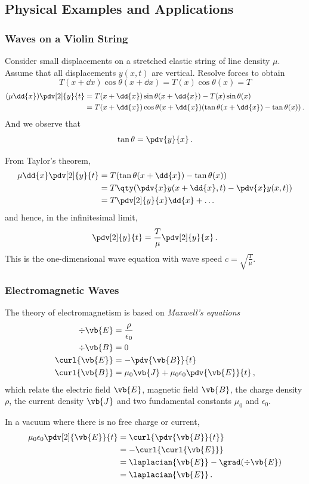 \documentclass{article}
\theoremstyle{plain}\theoremheaderfont{\normalfont\itshape}\theorembodyfont{\rmfamily}\theoremseparator{.}\newtheorem*{rem}{Remark}\newtheorem*{ex}{Example}\newtheorem*{proof}{Proof}\newtheorem*{altp}{Alternative proof}
\theoremstyle{plain}\theoremheaderfont{\normalfont\bfseries}\theorembodyfont{\rmfamily}\theoremseparator{.}\newtheorem{thm}{Theorem}[section]\newtheorem{lem}[thm]{Lemma}\newtheorem{prop}[thm]{Proposition}\newtheorem*{cor}{Corollary}\newtheorem{defn}[thm]{Definition}\newtheorem{clm}[thm]{Claim}\newtheorem{clminproof}{Claim}
\theoremstyle{break}\theoremheaderfont{\normalfont\itshape}\theorembodyfont{\rmfamily}\theoremseparator{.\medskip}\newtheorem*{proofskip}{Proof}\newtheorem*{exs}{Examples}\newtheorem*{rems}{Remarks}
\theoremstyle{break}\theoremheaderfont{\normalfont\bfseries}\theorembodyfont{\rmfamily}\theoremseparator{.\medskip}\newtheorem{lemskip}[thm]{Lemma}\newtheorem{defnskip}[thm]{Definition}\newtheorem{propskip}[thm]{Proposition}\newtheorem{thmskip}[thm]{Theorem}
\numberwithin{equation}{section}
\begin{document}
	\subsection{Physical Examples and Applications}
	\subsubsection{Waves on a Violin String}
	Consider small displacements on a stretched elastic string of line density \(\mu\). Assume that all displacements \(y(x,t)\) are vertical. Resolve forces to obtain
	\[T(x+\dd{x})\cos\theta(x+\dd{x})=T(x)\cos\theta(x)=T\]
	\begin{align*}
		(\mu\dd{x})\pdv[2]{y}{t}&=T(x+\dd{x})\sin\theta(x+\dd{x})-T(x)\sin\theta(x)\\
		&=T(x+\dd{x})\cos\theta(x+\dd{x})(\tan\theta(x+\dd{x})-\tan\theta(x))\,.
	\end{align*}
	And we observe that
	\[\tan\theta=\pdv{y}{x}\,.\]
	
	From Taylor's theorem,
	\begin{align*}
		\mu\dd{x}\pdv[2]{y}{t}&=T(\tan\theta(x+\dd{x})-\tan\theta(x))\\
		&=T\qty(\pdv{x}y(x+\dd{x},t)-\pdv{x} y(x,t))\\
		&=T\pdv[2]{y}{x}\dd{x}+\dots
	\end{align*}
	and hence, in the infinitesimal limit,
	\[\pdv[2]{y}{t}=\frac{T}{\mu}\pdv[2]{y}{x}\,.\]
	This is the one-dimensional wave equation with wave speed \(c=\sqrt{\frac{T}{\mu}}\).
	
	\subsubsection{Electromagnetic Waves}
	The theory of electromagnetism is based on \textit{Maxwell's equations}
	\begin{align*}
		\div{\vb{E}}&=\frac{\rho}{\epsilon_0}\\
		\div{\vb{B}}&=0\\
		\curl{\vb{E}}&=-\pdv{\vb{B}}{t}\\
		\curl{\vb{B}}&=\mu_0\vb{J}+\mu_0\epsilon_0\pdv{\vb{E}}{t}\,,
	\end{align*}
	which relate the electric field \(\vb{E}\), magnetic field \(\vb{B}\), the charge density \(\rho\), the current density \(\vb{J}\) and two fundamental constants \(\mu_0\) and \(\epsilon_0\).
	
	In a vacuum where there is no free charge or current,
	\begin{align*}
		\mu_0\epsilon_0\pdv[2]{\vb{E}}{t}&=\curl{\pdv{\vb{B}}{t}}\\
		&=-\curl{\curl{\vb{E}}}\\
		&=\laplacian{\vb{E}}-\grad(\div{\vb{E}})\\
		&=\laplacian{\vb{E}}\,.
	\end{align*}
	
\end{document}
